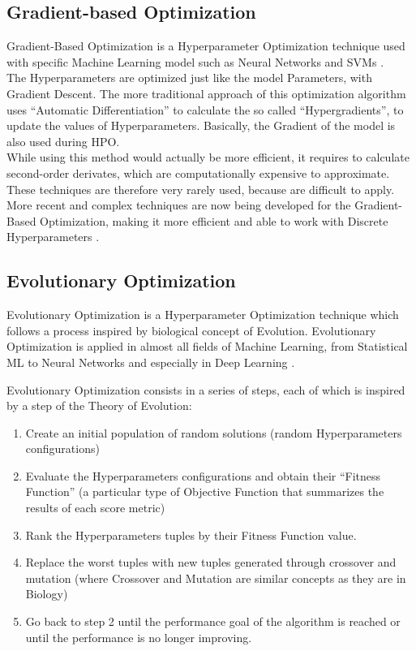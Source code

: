 \subsection{Gradient-based Optimization}

Gradient-Based Optimization is a Hyperparameter Optimization technique used with specific Machine Learning model such as Neural Networks and SVMs \cite{Tesi-1.8} \cite{Tesi-1.1}. 
\\[0.3cm]The Hyperparameters are optimized just like the model Parameters, with Gradient Descent.
The more traditional approach of this optimization algorithm uses “Automatic Differentiation” to calculate the so called “Hypergradients”, to update the values of Hyperparameters. Basically, the Gradient of the model is also used during HPO.
\\[0.3cm]While using this method would actually be more efficient, it requires to calculate second-order derivates, which are computationally expensive to approximate. These techniques are therefore very rarely used, because are difficult to apply.
\\[0.3cm]More recent and complex techniques are now being developed for the Gradient-Based Optimization, making it more efficient and able to work with Discrete Hyperparameters \cite{GradientOptimization}.

\subsection{Evolutionary Optimization}

Evolutionary Optimization is a Hyperparameter Optimization technique which follows a process inspired by biological concept of Evolution.
Evolutionary Optimization is applied in almost all fields of Machine Learning, from Statistical ML to Neural Networks and especially in Deep Learning \cite{Tesi-1.1} \cite{OptunaSamplers-NSGAII} \cite{OptunaSamplers-CMA-ES}.

Evolutionary Optimization consists in a series of steps, each of which is inspired by a step of the Theory of Evolution:
\begin{enumerate}[itemsep=0.1cm]
    \item Create an initial population of random solutions (random Hyperparameters configurations)
    \item Evaluate the Hyperparameters configurations and obtain their “Fitness Function” (a particular type of Objective Function that summarizes the results of each score metric)
    \item Rank the Hyperparameters tuples by their Fitness Function value.
    \item Replace the worst tuples with new tuples generated through crossover and mutation (where Crossover and Mutation are similar concepts as they are in Biology)
    \item Go back to step 2 until the performance goal of the algorithm is reached or until the performance is no longer improving.
\end{enumerate}

